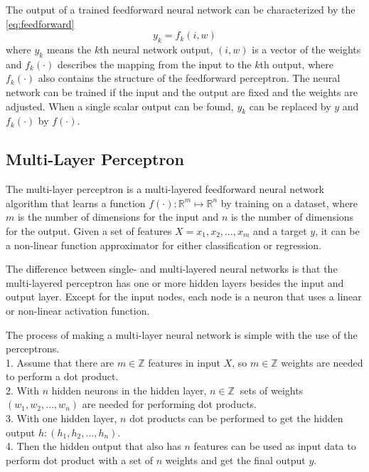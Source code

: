 \noindent The output of a trained feedforward neural network can be characterized by the \autoref{eq:feedforward}
\begin{equation} y_k = f_k(i,w) \label{eq:feedforward} \end{equation}
where $y_k$ means the $k$th neural network output, $(i,w)$ is a vector of the weights and $f_k(\cdot)$ describes the mapping from the input to the $k$th output, where $f_k(\cdot)$ also contains the structure of the feedforward perceptron. The neural network can be trained if the input and the output are fixed and the weights are adjusted. When a single scalar output can be found, $y_k$ can be replaced by $y$ and $f_k(\cdot)$ by $f(\cdot)$.



\subsection{Multi-Layer Perceptron}

The multi-layer perceptron is a multi-layered feedforward neural network algorithm that learns a function $f(\cdot) : \mathbb{R}^m \mapsto \mathbb{R}^n$ by training on a dataset, where $m$ is the number of dimensions for the input and $n$ is the number of dimensions for the output. Given a set of features $X = x_1, x_2, \dots, x_m$ and a target $y$, it can be a non-linear function approximator for either classification or regression. \medskip

The difference between single- and multi-layered neural networks is that the multi-layered perceptron has one or more hidden layers besides the input and output layer. Except for the input nodes, each node is a neuron that uses a linear or non-linear activation function. \medskip

The process of making a multi-layer neural network is simple with the use of the perceptrons.\\
1. Assume that there are $m\in\mathbb{Z}$ features in input $X$, so $m\in\mathbb{Z}$ weights are needed to perform a dot product.\\
2. With $n$ hidden neurons in the hidden layer, $n\in\mathbb{Z}~$ sets of weights $(w_1, w_2, \dots , w_n)$ are needed for performing dot products.\\
3. With one hidden layer, $n$ dot products can be performed to get the hidden output $h: (h_1, h_2, \dots , h_n).$\\
4. Then the hidden output that also has $n$ features can be used as input data to perform dot product with a set of $n$ weights and get the final output $y$. \bigskip

